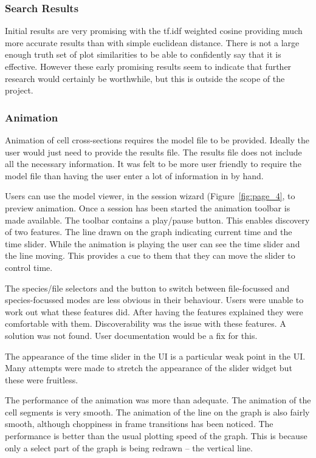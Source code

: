 \subsubsection{Search Results}
Initial results are very promising with the tf.idf weighted cosine providing much more accurate results than with simple euclidean distance.  There is not a large enough truth set of plot similarities to be able to confidently say that it is effective.  However these early promising results seem to indicate that further research would certainly be worthwhile, but this is outside the scope of the project.


\subsubsection{Animation}

Animation of cell cross-sections requires the model file to be provided.  Ideally the user would just need to provide the results file.  The results file does not include all the necessary information.  It was felt to be more user friendly to require the model file than having the user enter a lot of information in by hand.

Users can use the model viewer, in the session wizard (Figure~\ref{fig:page_4}, to preview animation.  Once a session has been started the animation toolbar is made available.  The toolbar contains a play/pause button.  This enables discovery of two features.  The line drawn on the graph indicating current time and the time slider.  While the animation is playing the user can see the time slider and the line moving.  This provides a cue to them that they can move the slider to control time.

The species/file selectors and the button to switch between file-focussed and species-focussed modes are less obvious in their behaviour.  Users were unable to work out what these features did.  After having the features explained they were comfortable with them.  Discoverability was the issue with these features.  A solution was not found. User documentation would be a fix for this.

The appearance of the time slider in the \ac{UI} is a particular weak point in the \ac{UI}.  Many attempts were made to stretch the appearance of the slider widget but these were fruitless.

The performance of the animation was more than adequate.  The animation of the cell segments is very smooth.  The animation of the line on the graph is also fairly smooth, although choppiness in frame transitions has been noticed.  The performance is better than the usual plotting speed of the graph. This is because only a select part of the graph is being redrawn -- the vertical line.

